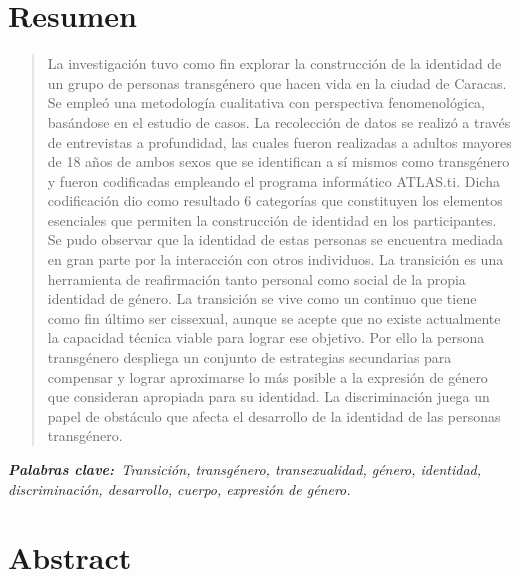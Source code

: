 %

\chapter{Resumen}

\begin{quote}
\small
La investigación tuvo como fin explorar la construcción de la identidad de un
grupo de personas transgénero que hacen vida en la ciudad de Caracas. Se empleó
una metodología cualitativa con perspectiva fenomenológica, basándose en el
estudio de casos. La recolección de datos se realizó a través de entrevistas a
profundidad, las cuales fueron realizadas a adultos mayores de 18 años de ambos
sexos que se identifican a sí mismos como transgénero y fueron codificadas
empleando el programa informático ATLAS.ti\@. Dicha codificación dio como
resultado 6 categorías que constituyen los elementos esenciales que permiten la
construcción de identidad en los participantes. Se pudo observar que la
identidad de estas personas se encuentra mediada en gran parte por la
interacción con otros individuos. La transición es una herramienta de
reafirmación tanto personal como social de la propia identidad de género. La
transición se vive como un continuo que tiene como fin último ser cissexual,
aunque se acepte que no existe actualmente la capacidad técnica viable para
lograr ese objetivo. Por ello la persona transgénero despliega un conjunto de
estrategias secundarias para compensar y lograr aproximarse lo más posible a la
expresión de género que consideran apropiada para su identidad. La
discriminación juega un papel de obstáculo que afecta el desarrollo de la
identidad de las personas transgénero.
\end{quote}

\itshape\textbf{Palabras clave:}\normalfont{}\ Transición, transgénero,
transexualidad, género, identidad, discriminación, desarrollo, cuerpo,
expresión de género.

\chapter{Abstract}


